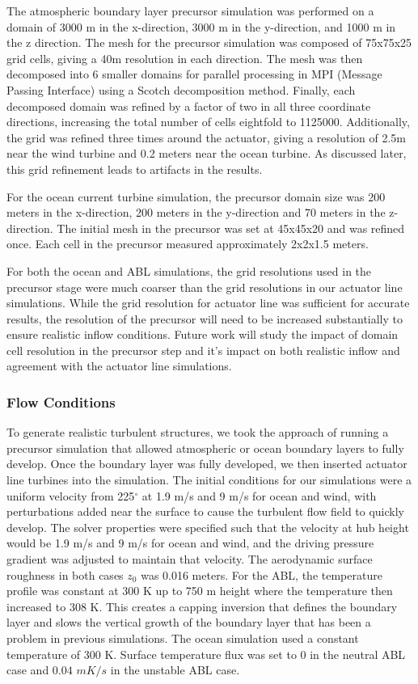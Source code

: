 The atmospheric boundary layer precursor simulation was performed on a domain of 3000 m in the x-direction, 3000 m in the y-direction, and 1000 m in the z direction.  The mesh for the precursor simulation was composed of 75x75x25 grid cells, giving a 40m resolution in each direction.  The mesh was then decomposed into 6 smaller domains for parallel processing in MPI (Message Passing Interface) using a Scotch decomposition method.  Finally, each decomposed domain was refined by a factor of two in all three coordinate directions, increasing the total number of cells eightfold to 1125000.  Additionally, the grid was refined three times around the actuator, giving a resolution of 2.5m near the wind turbine and 0.2 meters near the ocean turbine.  As discussed later, this grid refinement leads to artifacts in the results.

For the ocean current turbine simulation, the precursor domain size was 200 meters in the x-direction, 200 meters in the y-direction and 70 meters in the z-direction. The initial mesh in the precursor was set at 45x45x20 and was refined once. Each cell in the precursor measured approximately 2x2x1.5 meters. 

For both the ocean and ABL simulations, the grid resolutions used in the precursor stage were much coarser than the grid resolutions in our actuator line simulations. While the grid resolution for actuator line was sufficient for accurate results, the resolution of the precursor will need to be increased substantially to ensure realistic inflow conditions. Future work will study the impact of domain cell resolution in the precursor step and it's impact on both realistic inflow and agreement with the actuator line simulations.

\subsubsection{Flow Conditions}
To generate realistic turbulent structures, we took the approach of running a precursor simulation that allowed atmospheric or ocean boundary layers to fully develop.  Once the boundary layer was fully developed, we then inserted actuator line turbines into the simulation.  The initial conditions for our simulations were a uniform velocity from 225$^\circ$  at 1.9 m/s and 9 m/s for ocean and wind, with perturbations added near the surface to cause the turbulent flow field to quickly develop.  The solver properties were specified such that the velocity at hub height would be 1.9 m/s and 9 m/s for ocean and wind, and the driving pressure gradient was adjusted to maintain that velocity.  The aerodynamic surface roughness in both cases $z_{0}$ was 0.016 meters.  For the ABL, the temperature profile was constant at 300 K up to 750 m height where the temperature then increased to 308 K. This creates a capping inversion that defines the boundary layer and slows the vertical growth of the boundary layer that has been a problem in previous simulations.  The ocean simulation used a constant temperature of 300 K. Surface temperature flux was set to 0 in the neutral ABL case and $0.04$ $mK/s$ in the unstable ABL case.

